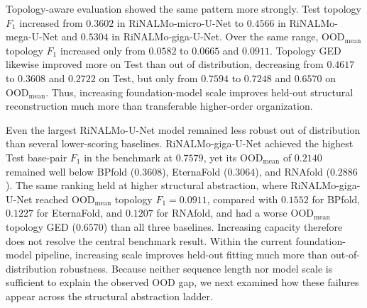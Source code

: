 \documentclass[pdflatex,sn-mathphys-num]{sn-jnl}%
\theoremstyle{thmstyleone}%
\theoremstyle{thmstyletwo}%
\theoremstyle{thmstylethree}%
\begin{document}
Topology-aware evaluation showed the same pattern more strongly.
Test topology $F_1$ increased from $0.3602$ in RiNALMo-micro-U-Net to $0.4566$ in RiNALMo-mega-U-Net and $0.5304$ in RiNALMo-giga-U-Net.
Over the same range, $\mathrm{OOD}_{\mathrm{mean}}$ topology $F_1$ increased only from $0.0582$ to $0.0665$ and $0.0911$.
Topology GED likewise improved more on Test than out of distribution, decreasing from $0.4617$ to $0.3608$ and $0.2722$ on Test, but only from $0.7594$ to $0.7248$ and $0.6570$ on $\mathrm{OOD}_{\mathrm{mean}}$.
Thus, increasing foundation-model scale improves held-out structural reconstruction much more than transferable higher-order organization.

Even the largest RiNALMo-U-Net model remained less robust out of distribution than several lower-scoring baselines.
RiNALMo-giga-U-Net achieved the highest Test base-pair $F_1$ in the benchmark at $0.7579$, yet its $\mathrm{OOD}_{\mathrm{mean}}$ of $0.2140$ remained well below BPfold ($0.3608$), EternaFold ($0.3064$), and RNAfold ($0.2886$).
The same ranking held at higher structural abstraction, where RiNALMo-giga-U-Net reached $\mathrm{OOD}_{\mathrm{mean}}$ topology $F_1 = 0.0911$, compared with $0.1552$ for BPfold, $0.1227$ for EternaFold, and $0.1207$ for RNAfold, and had a worse $\mathrm{OOD}_{\mathrm{mean}}$ topology GED ($0.6570$) than all three baselines.
Increasing capacity therefore does not resolve the central benchmark result.
Within the current foundation-model pipeline, increasing scale improves held-out fitting much more than out-of-distribution robustness.
Because neither sequence length nor model scale is sufficient to explain the observed OOD gap, we next examined how these failures appear across the structural abstraction ladder.
\end{document}

